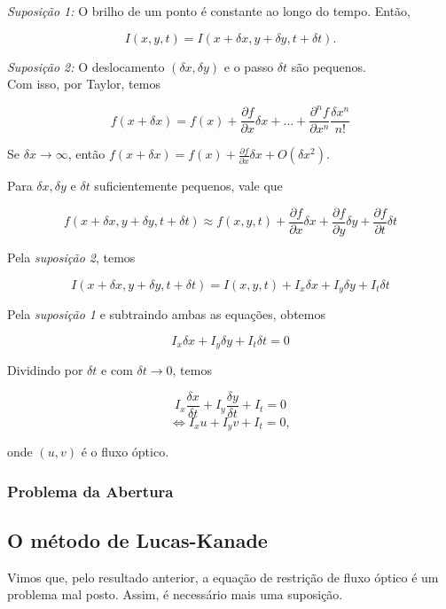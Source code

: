 \documentclass[12pt, a4paper]{article}
\begin{document}
\textit{Suposição 1:} O brilho de um ponto é constante ao longo do tempo. Então, 

\[ I(x, y, t) = I(x+ \delta x, y + \delta y, t+\delta t).\]

\textit{Suposição 2:} O deslocamento $(\delta x, \delta y)$ e o passo $\delta t$ são pequenos. \\

Com isso, por Taylor, temos

\[ f(x+\delta x) = f(x) + \frac{\partial f}{\partial x} \delta x + \dots + \frac{\partial^n f}{\partial x^n} \frac{\delta x^n}{n!}\]

Se $\delta x \to \infty$, então $f(x + \delta x) = f(x) + \frac{\partial f}{\partial x} \delta x + O(\delta x^2)$.

Para $\delta x, \delta y$ e $\delta t$ suficientemente pequenos, vale que

\[ f(x + \delta x, y + \delta y, t + \delta t) \approx f(x, y, t) + \frac{\partial f}{\partial x} \delta x + \frac{\partial f}{\partial y} \delta y + \frac{\partial f}{\partial t} \delta t \]

Pela \textit{suposição 2}, temos

\[ I(x + \delta x, y + \delta y, t + \delta t) = I(x, y, t) + I_x \delta x + I_y \delta y + I_t \delta t\]

Pela \textit{suposição 1} e subtraindo ambas as equações, obtemos

\[ I_x \delta x + I_y \delta y + I_t \delta t = 0\]

Dividindo por $\delta t$ e com $\delta t \to 0$, temos

\[ I_x \frac{\delta x}{\delta t} + I_y \frac{\delta y}{\delta t} + I_t  = 0\]
\[ \Leftrightarrow I_x u + I_y v + I_t  = 0, \]

onde $(u, v)$ é o fluxo óptico.

\subsubsection{Problema da Abertura}

\subsection{O método de Lucas-Kanade}

Vimos que, pelo resultado anterior, a equação de restrição de fluxo óptico é um problema mal posto. Assim, é necessário mais uma suposição. \\
\end{document}
